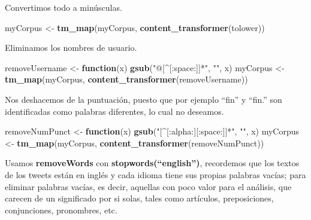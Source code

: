 \documentclass[]{article}
\newenvironment{Shaded}{\begin{snugshade}}{\end{snugshade}}
\newcommand{\ControlFlowTok}[1]{\textcolor[rgb]{0.13,0.29,0.53}{\textbf{#1}}}
\newcommand{\KeywordTok}[1]{\textcolor[rgb]{0.13,0.29,0.53}{\textbf{#1}}}
\newcommand{\NormalTok}[1]{#1}
\newcommand{\StringTok}[1]{\textcolor[rgb]{0.31,0.60,0.02}{#1}}
\begin{document}
Convertimos todo a minúsculas.

\begin{Shaded}
\begin{Highlighting}[]
\NormalTok{myCorpus <-}\StringTok{ }\KeywordTok{tm_map}\NormalTok{(myCorpus, }\KeywordTok{content_transformer}\NormalTok{(tolower))}
\end{Highlighting}
\end{Shaded}

Eliminamos los nombres de usuario.

\begin{Shaded}
\begin{Highlighting}[]
\NormalTok{removeUsername <-}\StringTok{ }\ControlFlowTok{function}\NormalTok{(x) }\KeywordTok{gsub}\NormalTok{(}\StringTok{"@[^[:space:]]*"}\NormalTok{, }\StringTok{""}\NormalTok{, x)  }
\NormalTok{myCorpus <-}\StringTok{ }\KeywordTok{tm_map}\NormalTok{(myCorpus, }\KeywordTok{content_transformer}\NormalTok{(removeUsername))}
\end{Highlighting}
\end{Shaded}

Nos deshacemos de la puntuación, puesto que por ejemplo ``fin'' y
``fin.'' son identificadas como palabras diferentes, lo cual no
deseamos.

\begin{Shaded}
\begin{Highlighting}[]
\NormalTok{removeNumPunct <-}\StringTok{ }\ControlFlowTok{function}\NormalTok{(x) }\KeywordTok{gsub}\NormalTok{(}\StringTok{"[^[:alpha:][:space:]]*"}\NormalTok{, }\StringTok{""}\NormalTok{, x)   }
\NormalTok{myCorpus <-}\StringTok{ }\KeywordTok{tm_map}\NormalTok{(myCorpus, }\KeywordTok{content_transformer}\NormalTok{(removeNumPunct))}
\end{Highlighting}
\end{Shaded}

Usamos \textbf{removeWords} con \textbf{stopwords(``english'')},
recordemos que los textos de los tweets están en inglés y cada idioma
tiene sus propias palabras vacías; para eliminar palabras vacías, es
decir, aquellas con poco valor para el análisis, que carecen de un
significado por si solas, tales como artículos, preposiciones,
conjunciones, pronombres, etc.
\end{document}
